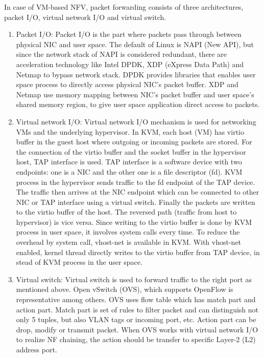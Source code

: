 In case of VM-based NFV, packet forwarding consists of three architectures, packet I/O, virtual network I/O and virtual switch. 
\begin{enumerate}
	\item Packet I/O: 
	 Packet I/O is the part where packets pass through between physical NIC and user space. The default of Linux is NAPI (New API)\cite{NAPI}, but since the network stack of NAPI is considered redundant, there are acceleration technology like Intel DPDK\cite{DPDK}, XDP (eXpress Data Path)\cite{XDP} and Netmap\cite{Netmap} to bypass network stack. DPDK provides libraries that enables user space process to directly access physical NIC's packet buffer. XDP and Netmap use memory mapping between NIC's packet buffer and user space's shared memory region, to give user space application direct access to packets. 
	\item Virtual network I/O: 
	Virtual network I/O mechanism is used for networking VMs and the underlying hypervisor. In KVM, each host (VM) has virtio\cite{virtio} buffer in the guest host where outgoing or incoming packets are stored. For the connection of the virtio buffer and the socket buffer in the hypervisor host, TAP interface is used. TAP interface is a software device with two endpoints: one is a NIC and the other one is a file descriptor (fd). KVM process in the hypervisor sends traffic to the fd endpoint of the TAP device. The traffic then arrives at the NIC endpoint which can be connected to other NIC or TAP interface using a virtual switch. Finally the packets are written to the virtio buffer of the host. The reversed path (traffic from host to hypervisor) is vice versa. Since writing to the virtio buffer is done by KVM process in user space, it involves system calls every time. To reduce the overhead by system call, vhost-net\cite{vhost-net} is available in KVM. With vhost-net enabled, kernel thread directly writes to the virtio buffer from TAP device, in stead of KVM process in the user space. 
	\item Virtual switch: 
	Virtual switch is used to forward traffic to the right port as mentioned above. Open vSwitch (OVS)\cite{OVS}, which supports OpenFlow\cite{OpenFlow} is representative among others. OVS uses flow table which has match part and action part. Match part is set of rules to filter packet and can distinguish not only 5 tuples, but also VLAN tags or incoming port, etc. Action part can be drop, modify or transmit packet. When OVS works with virtual network I/O to realize NF chaining, the action should be transfer to specific Layer-2 (L2) address port. 
\end{enumerate}


